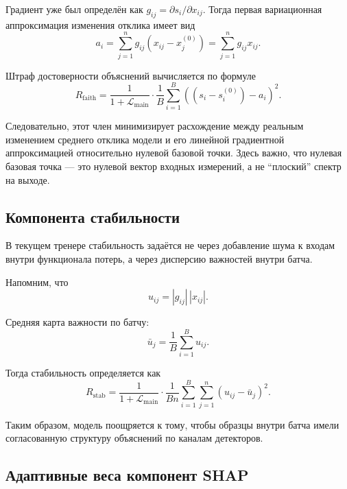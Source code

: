 \documentclass[11pt]{article}
\begin{document}
Градиент уже был определён как $g_{ij} = \partial s_i / \partial x_{ij}$. Тогда первая вариационная аппроксимация изменения отклика имеет вид
\begin{equation}
 a_i = \sum_{j=1}^{n} g_{ij}(x_{ij} - x_j^{(0)}) = \sum_{j=1}^{n} g_{ij}x_{ij}.
\end{equation}

Штраф достоверности объяснений вычисляется по формуле
\begin{equation}
R_{\mathrm{faith}} = \frac{1}{1 + \mathcal{L}_{\mathrm{main}}}
\cdot
\frac{1}{B} \sum_{i=1}^{B} \left( (s_i - s_i^{(0)}) - a_i \right)^2.
\end{equation}

Следовательно, этот член минимизирует расхождение между реальным изменением среднего отклика модели и его линейной градиентной аппроксимацией относительно нулевой базовой точки.
Здесь важно, что нулевая базовая точка --- это нулевой вектор входных измерений, а не ``плоский'' спектр на выходе.

\subsection{Компонента стабильности}

В текущем тренере стабильность задаётся не через добавление шума к входам внутри функционала потерь, а через дисперсию важностей внутри батча.

Напомним, что
\begin{equation}
 u_{ij} = |g_{ij}|\,|x_{ij}|.
\end{equation}

Средняя карта важности по батчу:
\begin{equation}
 \bar{u}_j = \frac{1}{B} \sum_{i=1}^{B} u_{ij}.
\end{equation}

Тогда стабильность определяется как
\begin{equation}
R_{\mathrm{stab}} = \frac{1}{1 + \mathcal{L}_{\mathrm{main}}}
\cdot
\frac{1}{Bn} \sum_{i=1}^{B} \sum_{j=1}^{n} (u_{ij} - \bar{u}_j)^2.
\end{equation}

Таким образом, модель поощряется к тому, чтобы образцы внутри батча имели согласованную структуру объяснений по каналам детекторов.

\subsection{Адаптивные веса компонент SHAP}
\end{document}
